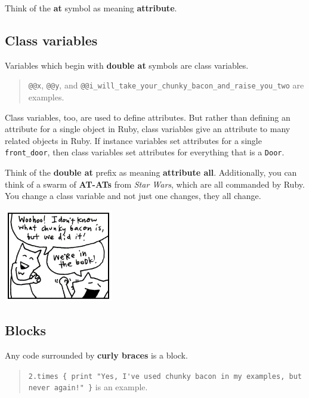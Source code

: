 \documentclass[10pt,twoside]{report}
\begin{document}
Think of the {\bf at} symbol as meaning {\bf attribute}.




\subsection{Class variables}



Variables which begin with {\bf double at} symbols are class
variables.

\begin{quote}
\lstinline[breaklines=true]|@@x|, \lstinline[breaklines=true]|@@y|,
and
\lstinline[breaklines=true]|@@i_will_take_your_chunky_bacon_and_raise_you_two|
are examples.\end{quote}


Class variables, too, are used to define attributes.  But rather than
defining an attribute for a single object in Ruby, class variables
give an attribute to many related objects in Ruby.  If instance
variables set attributes for a single
\lstinline[breaklines=true]|front_door|, then class variables set
attributes for everything that is a \lstinline[breaklines=true]|Door|.

Think of the {\bf double at} prefix as meaning {\bf attribute all}.
Additionally, you can think of a swarm of {\bf AT-ATs} from {\em Star
  Wars}, which are all commanded by Ruby.  You change a class variable
and not just one changes, they all change.

	\includegraphics[width=0.3575\textwidth]{cache/13.png}




\subsection{Blocks}



Any code surrounded by {\bf curly braces} is a block.

\begin{quote}
\lstinline[breaklines=true]|2.times { print "Yes, I've used chunky bacon in my examples, but never again!" }| is an example.\end{quote}
\end{document}
